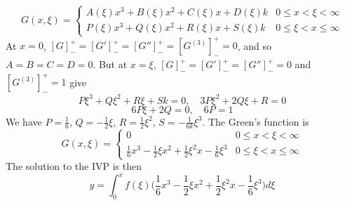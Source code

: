 \documentclass[a4paper]{article}
\begin{document}
\begin{ans}
\begin{enumerate}[label=(\alph*)]
$$G(x,\xi)=
\left\{
        \begin{array}{ll}
      A(\xi)x^3+B(\xi)x^2+C(\xi)x+D(\xi)k & 0\leq x<\xi<\infty \\
      P(\xi)x^3+Q(\xi)x^2+R(\xi)x+S(\xi)k & 0\leq\xi< x\leq \infty
        \end{array}
    \right.$$
At $x=0$, $[G]_-^+=[G']_-^+=[G'']_-^+=[G^{(3)}]_-^+=0$, and so $A=B=C=D=0$. But at $x=\xi$, $[G]_-^+=[G']_-^+=[G'']_-^+=0$ and $[G^{(3)}]_-^+=1$ give $$P\xi^3+Q\xi^2+R\xi+Sk=0,\quad 3P\xi^2+2Q\xi+R=0$$ 
$$6P\xi+2Q=0,\quad 6P=1$$
We have $P=\frac{1}{6}$, $Q=-\frac{1}{2}\xi$, $R=\frac{1}{2}\xi^2$, $S=-\frac{1}{6k}\xi^3$. The Green's function is
$$G(x,\xi)=
\left\{
        \begin{array}{ll}
      0& 0\leq x<\xi<\infty \\
      \frac{1}{6}x^3-\frac{1}{2}\xi x^2+\frac{1}{2}\xi^2x-\frac{1}{6}\xi^3 & 0\leq\xi< x\leq \infty
        \end{array}
    \right.$$
The solution to the IVP is then
$$y=\int_0^xf(\xi)\bigg(\frac{1}{6}x^3-\frac{1}{2}\xi x^2+\frac{1}{2}\xi^2x-\frac{1}{6}\xi^3\bigg)d\xi$$
\end{enumerate}
\end{ans}
\newpage
\end{document}
